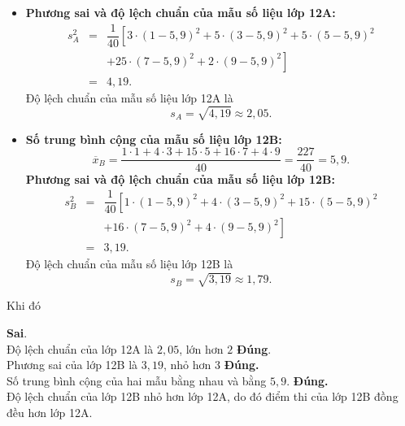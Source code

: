 \begin{ex}
{\begin{itemize}
			\textbf{Số trung bình cộng của mẫu số liệu lớp 12A:}
			\[
			\overline{x}_A = \dfrac{3 \cdot 1 + 5 \cdot 3 + 5 \cdot 5 + 25 \cdot 7 + 2 \cdot 9}{40} = \dfrac{227}{40} = 5,9.
			\]
			\item \textbf{Phương sai và độ lệch chuẩn của mẫu số liệu lớp 12A:}
			\begin{eqnarray*}
				s_A^2 &=& \dfrac{1}{40} \left[3 \cdot (1 - 5,9)^2 + 5 \cdot (3 - 5,9)^2 + 5 \cdot (5 - 5,9)^2\right. \\
				&&\left.+ 25 \cdot (7 - 5,9)^2 + 2 \cdot (9 - 5,9)^2\right]\\
				&=&  4{,}19.
			\end{eqnarray*}
			Độ lệch chuẩn của mẫu số liệu lớp 12A là
			\[
			s_A = \sqrt{4{,}19} \approx 2{,}05.
			\]
			\item \textbf{Số trung bình cộng của mẫu số liệu lớp 12B:}
			\[
			\overline{x}_B = \dfrac{1 \cdot 1 + 4 \cdot 3 + 15 \cdot 5 + 16 \cdot 7 + 4 \cdot 9}{40} = \dfrac{227}{40} = 5{,}9.
			\]			
			\textbf{Phương sai và độ lệch chuẩn của mẫu số liệu lớp 12B:}
			\begin{eqnarray*}
				s_B^2 &=& \dfrac{1}{40} \left[1 \cdot (1 - 5,9)^2 + 4 \cdot (3 - 5,9)^2 + 15 \cdot (5 - 5,9)^2\right.\\
				&&\left.+ 16 \cdot (7 - 5,9)^2 + 4 \cdot (9 - 5,9)^2\right] \\
				&=&3{,}19.
			\end{eqnarray*}
			Độ lệch chuẩn của mẫu số liệu lớp 12B là
			\[
			s_B = \sqrt{3{,}19} \approx 1{,}79.
			\]
		\end{itemize}
		Khi đó 
		\begin{itemchoice} 
			\itemch \textbf{Sai}.\\
			Độ lệch chuẩn của lớp 12A là $2{,}05$, lớn hơn $2$ 
			\itemch \textbf{Đúng}.\\
			Phương sai của lớp 12B là $3{,}19$, nhỏ hơn $3$
			\itemch \textbf{Đúng.} \\
			Số trung bình cộng của hai mẫu bằng nhau và bằng $5,9$.
			\itemch \textbf{Đúng.} \\
			Độ lệch chuẩn của lớp 12B nhỏ hơn lớp 12A, do đó điểm thi của lớp 12B đồng đều hơn lớp 12A.
		\end{itemchoice}
	}
\end{ex}

